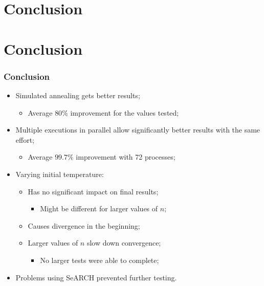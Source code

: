 \section{Conclusion}
\label{sec:conclusion}

\section{Conclusion}
\begin{frame}
	\frametitle{Conclusion}
	\begin{itemize}
		\item{Simulated annealing gets better results;
		\begin{itemize}
			\item{Average $80\%$ improvement for the values tested;}
		\end{itemize}
		}
		\item{Multiple executions in parallel allow significantly better results with the same effort;
		\begin{itemize}
			\item{Average $99.7\%$ improvement with 72 processes;}
		\end{itemize}
		}
		\item{Varying initial temperature:
		\begin{itemize}
			\item{Has no significant impact on final results;
			\begin{itemize}
				\item{Might be different for larger values of $n$;}
			\end{itemize}
			}
			\item{Causes divergence in the beginning;}
			\item{Larger values of $n$ slow down convergence;
			\begin{itemize}
				\item{No larger tests were able to complete;}
			\end{itemize}
			}
		\end{itemize}
		}
		\item{Problems using SeARCH prevented further testing.}
	\end{itemize}
\end{frame}
